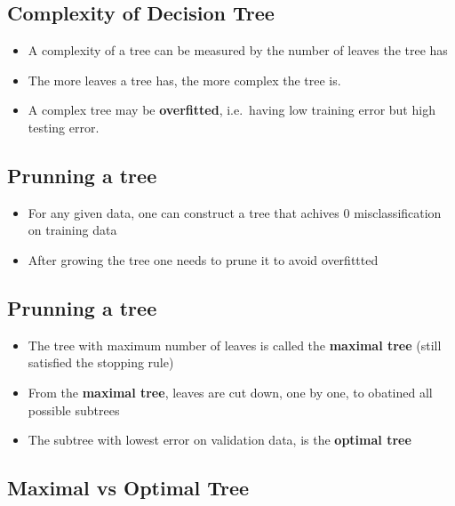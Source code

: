 \documentclass[
]{article}
\providecommand{\tightlist}{%
  \setlength{\itemsep}{0pt}\setlength{\parskip}{0pt}}
\begin{document}
\hypertarget{complexity-of-decision-tree}{%
\subsection{Complexity of Decision
Tree}\label{complexity-of-decision-tree}}

\begin{itemize}
\tightlist
\item
  A complexity of a tree can be measured by the number of leaves the
  tree has
\item
  The more leaves a tree has, the more complex the tree is.
\item
  A complex tree may be \textbf{overfitted}, i.e.~having low training
  error but high testing error.
\end{itemize}

\hypertarget{prunning-a-tree}{%
\subsection{Prunning a tree}\label{prunning-a-tree}}

\begin{itemize}
\tightlist
\item
  For any given data, one can construct a tree that achives 0
  misclassification on training data
\item
  After growing the tree one needs to prune it to avoid overfittted
\end{itemize}

\hypertarget{prunning-a-tree-1}{%
\subsection{Prunning a tree}\label{prunning-a-tree-1}}

\begin{itemize}
\tightlist
\item
  The tree with maximum number of leaves is called the \textbf{maximal
  tree} (still satisfied the stopping rule)
\item
  From the \textbf{maximal tree}, leaves are cut down, one by one, to
  obatined all possible subtrees
\item
  The subtree with lowest error on validation data, is the
  \textbf{optimal tree}
\end{itemize}

\hypertarget{maximal-vs-optimal-tree}{%
\subsection{Maximal vs Optimal Tree}\label{maximal-vs-optimal-tree}}
\end{document}
